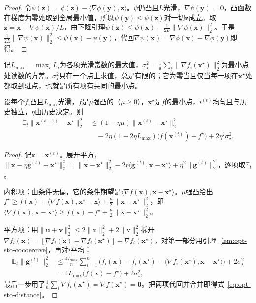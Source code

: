 \begin{proof}
令$\psi(\bm z)=\phi(\bm z)-\langle\nabla\phi(\bm y),\bm z\rangle$。$\psi$仍凸且$L$光滑，$\nabla\psi(\bm y)=\bm0$，凸函数在梯度为零处取到全局最小值，所以$\psi(\bm y)\leq\psi(\bm z)$对一切$\bm z$成立。取$\bm z=\bm x-\nabla\psi(\bm x)/L$，由下降引理$\psi(\bm z)\leq\psi(\bm x)-\tfrac1{2L}\lVert\nabla\psi(\bm x)\rVert_2^2$。于是$\tfrac1{2L}\lVert\nabla\psi(\bm x)\rVert_2^2\leq\psi(\bm x)-\psi(\bm y)$，代回$\nabla\psi(\bm x)=\nabla\phi(\bm x)-\nabla\phi(\bm y)$即得。
\end{proof}

记$L_{\max}=\max_iL_i$为各项光滑常数的最大值，$\sigma_\star^2=\frac1n\sum_i\lVert\nabla f_i(\bm x^\star)\rVert_2^2$为最小点处读数的方差。$\sigma_\star^2$只在一个点上求值，总是有限的；它为零当且仅当每一项在$\bm x^\star$处都取到驻点，也就是所有项有共同的最小点。

\begin{lemma}[均匀抽样的距离递推]
\label{lem:opt-sto-distance}
设每个$f_i$凸且$L_{\max}$光滑，$f$是$\mu$强凸的（$\mu\geq0$），$\bm x^\star$是$f$的最小点，$i^{(t)}$均匀且与历史独立，$\eta$由历史决定。则
\begin{equation}
\label{eq:opt-sto-distance}
  \begin{aligned}
    \mathbb E_t\lVert\bm x^{(t+1)}-\bm x^\star\rVert_2^2
    &\leq(1-\eta\mu)\lVert\bm x^{(t)}-\bm x^\star\rVert_2^2\\
    &\quad-2\eta(1-2\eta L_{\max})\bigl(f(\bm x^{(t)})-f^\star\bigr)+2\eta^2\sigma_\star^2 .
  \end{aligned}
\end{equation}
\end{lemma}

\begin{proof}
记$\bm x=\bm x^{(t)}$。展开平方，$\lVert\bm x-\eta\bm g^{(t)}-\bm x^\star\rVert_2^2=\lVert\bm x-\bm x^\star\rVert_2^2-2\eta\langle\bm g^{(t)},\bm x-\bm x^\star\rangle+\eta^2\lVert\bm g^{(t)}\rVert_2^2$，逐项取$\mathbb E_t$。

内积项：由条件无偏，它的条件期望是$\langle\nabla f(\bm x),\bm x-\bm x^\star\rangle$。$\mu$强凸给出$f^\star\geq f(\bm x)+\langle\nabla f(\bm x),\bm x^\star-\bm x\rangle+\tfrac\mu2\lVert\bm x-\bm x^\star\rVert_2^2$，即$\langle\nabla f(\bm x),\bm x-\bm x^\star\rangle\geq f(\bm x)-f^\star+\tfrac\mu2\lVert\bm x-\bm x^\star\rVert_2^2$。

平方项：用$\lVert\bm u+\bm v\rVert_2^2\leq2\lVert\bm u\rVert_2^2+2\lVert\bm v\rVert_2^2$拆开$\nabla f_i(\bm x)=[\nabla f_i(\bm x)-\nabla f_i(\bm x^\star)]+\nabla f_i(\bm x^\star)$，对第一部分用引理~\ref{lem:opt-sto-cocoercive}，再对$i$平均：
\[
  \begin{aligned}
    \mathbb E_t\lVert\bm g^{(t)}\rVert_2^2
    &\leq\frac{4L_{\max}}n\sum_{i=1}^n\bigl(f_i(\bm x)-f_i(\bm x^\star)-\langle\nabla f_i(\bm x^\star),\bm x-\bm x^\star\rangle\bigr)+2\sigma_\star^2\\
    &=4L_{\max}\bigl(f(\bm x)-f^\star\bigr)+2\sigma_\star^2,
  \end{aligned}
\]
最后一步用了$\frac1n\sum_i\nabla f_i(\bm x^\star)=\nabla f(\bm x^\star)=\bm0$。把两项代回并合并即得式~\eqref{eq:opt-sto-distance}。
\end{proof}

